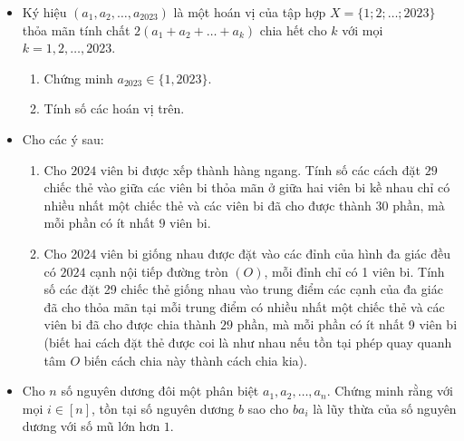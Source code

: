 \documentclass[11pt]{scrartcl}
\begin{document}
\begin{itemize}[label=, leftmargin=0em, itemsep=0.5em]
\begin{btvn}
    \end{btvn}
    \item \begin{btvn} Ký hiệu $(a_1, a_2, \ldots, a_{2023})$ là một hoán vị của tập hợp $X = \{1; 2; \ldots; 2023\}$ thỏa mãn tính chất $2(a_1 + a_2 + \ldots + a_k)$ chia hết cho $k$ với mọi $k = 1, 2, \ldots, 2023$.
        \begin{enumerate}
            \item Chứng minh $a_{2023} \in \{1, 2023\}$.
            \item Tính số các hoán vị trên.
        \end{enumerate}
    \end{btvn}

    \item \begin{btvn}
        Cho các ý sau:
        \begin{enumerate}[label=(\alph*)]
            \item Cho $2024$ viên bi được xếp thành hàng ngang. Tính số các cách đặt $29$ chiếc thẻ vào giữa các viên bi thỏa mãn ở giữa hai viên bi kề nhau chỉ có nhiều nhất một chiếc thẻ và các viên bi đã cho được thành $30$ phần, mà mỗi phần có ít nhất $9$ viên bi.
            \item Cho 2024 viên bi giống nhau được đặt vào các đỉnh của hình đa giác đều có $2024$ cạnh nội tiếp đường tròn $(O)$, mỗi đỉnh chỉ có 1 viên bi. Tính số các đặt 29 chiếc thẻ giống nhau vào trung điểm các cạnh của đa giác đã cho thỏa mãn tại mỗi trung điểm có nhiều nhất một chiếc thẻ và các viên bi đã cho được chia thành $29$ phần, mà mỗi phần có ít nhất 9 viên bi (biết hai cách đặt thẻ được coi là như nhau nếu tồn tại phép quay quanh tâm $O$ biến cách chia này thành cách chia kia).
        \end{enumerate}
    \end{btvn}
    \item \begin{btvn}
        Cho $n$ số nguyên dương đôi một phân biệt $a_1,a_2,\dots,a_n$. Chứng minh rằng với mọi $i \in [n]$, tồn tại số nguyên dương $b$ sao cho $ba_i$ là lũy thừa của số nguyên dương với số mũ lớn hơn $1$.
    \end{btvn}


\end{itemize}
\end{document}
